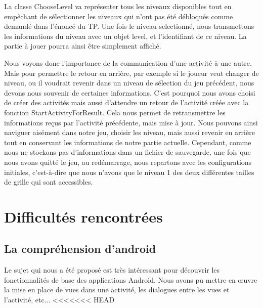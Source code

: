 \documentclass[12pt, a4paper]{article}%
\begin{document}
La classe ChooseLevel va représenter tous les niveaux disponibles tout en empêchant de sélectionner les niveaux qui n'ont pas été débloqués comme demandé dans l'énoncé du TP. Une fois le niveau selectionné, nous transmettons les informations du niveau avec un objet level, et l'identifiant de ce niveau. La partie à jouer pourra ainsi être simplement affiché.

Nous voyons donc l'importance de la communication d'une activité à une autre. Mais pour permettre le retour en arrière, par exemple si le joueur veut changer de niveau, ou il voudrait revenir dans un niveau de sélection du jeu précédent, nous devons nous souvenir de certaines informations. C'est pourquoi nous avons choisi de créer des activités mais aussi d'attendre un retour de l'activité créée avec la fonction StartActivityForResult. Cela nous permet de retransmettre les informations reçus par l'activité précédente, mais mise à jour. Nous pouvons ainsi naviguer aisément dans notre jeu, choisir les niveau, mais aussi revenir en arrière tout en conservant les informations de notre partie actuelle. Cependant, comme nous ne stockons pas d'informations dans un fichier de sauvegarde, une fois que nous avons quitté le jeu, au redémarrage, nous repartons avec les configurations initiales, c'est-à-dire que nous n'avons que le niveau 1 des deux différentes tailles de grille qui sont accessibles.  

\section{Difficultés rencontrées}
  \subsection{La compréhension d'android}
  Le sujet qui nous a été proposé est très intéressant pour découvrir les fonctionnalités de base des applications Android. Nous avons pu mettre en œuvre la mise en place de vues dans une activité, les dialogues entre les vues et l'activité, etc...
<<<<<<< HEAD
  
\end{document}
